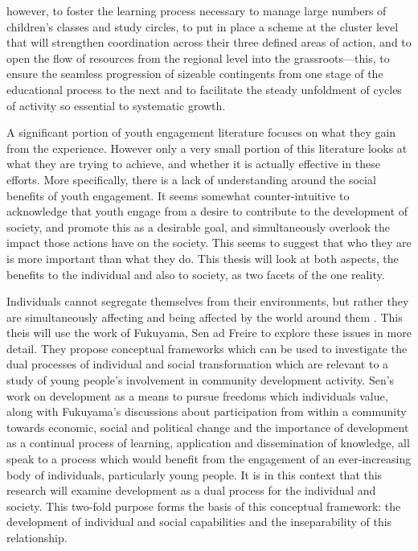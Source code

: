 however, to foster the learning process necessary to manage large numbers of children’s classes and study circles, to put in place a scheme at the cluster level that will strengthen coordination across their three defined areas of action, and to open the flow of resources from the regional level into the grassroots—this, to ensure the seamless progression of sizeable contingents from one stage of the educational process to the next and to facilitate the steady unfoldment of cycles of activity so essential to systematic growth.

A significant portion of youth engagement literature focuses on what they gain from the experience. However only a very small portion of this literature looks at what they are trying to achieve, and whether it is actually effective in these efforts. More specifically, there is a lack of understanding around the social benefits of youth engagement. It seems somewhat counter-intuitive to acknowledge that youth engage from a desire to contribute to the development of society, and promote this as a desirable goal, and simultaneously overlook the impact those actions have on the society. This seems to suggest that who they are is more important than what they do. This thesis will look at both aspects, the benefits to the individual and also to society, as two facets of the one reality. 

Individuals cannot segregate themselves from their environments, but rather they are simultaneously affecting and being affected by the world around them \citep{Sen1999, ISGP2010}. This theis will use the work of Fukuyama, Sen ad Freire to explore these issues in more detail. They propose conceptual frameworks which can be used to investigate the dual processes of individual and social transformation which are relevant to a study of young people's involvement in community development activity. Sen's work on development as a means to pursue freedoms which individuals value, along with Fukuyama's discussions about participation from within a community towards economic, social and political change and the importance of development as a continual process of learning, application and dissemination of knowledge, all speak to a process which would benefit from the engagement of an ever-increasing body of individuals, particularly young people. It is in this context that this research will examine development as a dual process for the individual and society. This two-fold purpose forms the basis of this conceptual framework: the development of individual and social capabilities and the inseparability of this relationship. 


